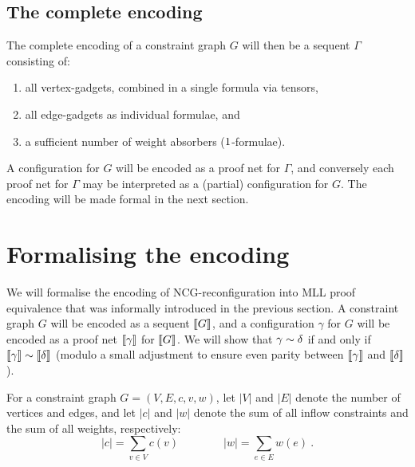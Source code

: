 \documentclass{lmcs}
\let\capsabbrev=\uppercase
\begin{document}
\subsection*{The complete encoding}

The complete encoding of a constraint graph $G$ will then be a sequent $\Gamma$ consisting of:
%
\begin{enumerate}
 	\item
all vertex-gadgets, combined in a single formula via tensors, 
	\item
all edge-gadgets as individual formulae, and
	\item
a sufficient number of weight absorbers ($1$-formulae).
\end{enumerate}
%
A configuration for $G$ will be encoded as a proof net for $\Gamma$, and conversely each proof net for $\Gamma$ may be interpreted as a (partial) configuration for $G$. The encoding will be made formal in the next section. %




\section{Formalising the encoding}
\label{sec:correctness}


We will formalise the encoding of \capsabbrev{ncg}-reconfiguration into \capsabbrev{mll} proof equivalence that was informally introduced in the previous section. %
A constraint graph $G$ will be encoded as a sequent $\llbracket G\rrbracket$, and a configuration $\gamma$ for $G$ will be encoded as a proof net $\llbracket\gamma\rrbracket$ for $\llbracket G\rrbracket$. We will show that $\gamma\perm\delta$ if and only if $\itn\gamma\perm\itn\delta$ (modulo a small adjustment to ensure even parity between $\llbracket\gamma\rrbracket$ and $\llbracket\delta\rrbracket$).

For a constraint graph $G=(V,E,c,v,w)$, let $|V|$ and $|E|$ denote the number of vertices and edges, and let $|c|$ and $|w|$ denote the sum of all inflow constraints and the sum of all weights, respectively:
\[
	|c| = \sum_{v\in V}c(v) \qquad\qquad |w| = \sum_{e\in E}w(e)~.
\]
\end{document}
